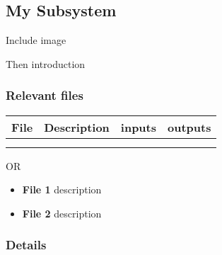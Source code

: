 \subsection{My Subsystem}

Include image

Then introduction

\subsubsection{Relevant files}
\begin{tabular}{|l|l|l|l|}
\hline File  & Description & inputs & outputs \\ 
\hline  &  &  &  \\ 
\hline  &  &  &  \\ 
\hline 
\end{tabular} 

OR 

\begin{itemize}
\item \textbf{File 1} description
\item \textbf{File 2} description
\end{itemize}

\subsubsection{Details}